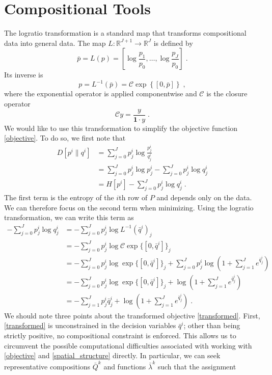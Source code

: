 \documentclass[english]{scrartcl}
\newcommand\R[0]{\mathbb{R}}
\begin{document}
\section{Compositional Tools}
	The logratio transformation is a standard map that transforms compositional data into general data. The map $L:\R^{J+1} \rightarrow \R^J$ is defined by
	\begin{equation}
		\bar{p} = L(p) = \left[\log \frac{p_1}{p_0},\ldots,\log \frac{p_J}{p_0}\right]\;.
	\end{equation}
	Its inverse is
	\begin{equation}
		p = L^{-1}(\bar{p}) = \mathcal{C}\exp\left\{[0, \bar{p}] \right\}\;,
	\end{equation}
	where the exponential operator is applied componentwise and $\mathcal{C}$ is the closure operator
	\begin{equation}
		\mathcal{C}y = \frac{y}{\mathbf{1}\cdot y} \;.
	\end{equation}
	We would like to use this transformation to simplify the objective function \eqref{objective}. To do so, we first note that
	\begin{align}
		D[p^i\|q^i] &= \sum_{j = 0}^J p^i_j \log \frac{p^i_j}{q^i_j} \\
		&= \sum_{j = 0}^J p^i_j \log p_j^i - \sum_{j = 0}^J p^i_j \log q_j^i \\
		&= H[p^i] - \sum_{j = 0}^J p^i_j \log q_j^i\;.
	\end{align}
	The first term is the entropy of the $i$th row of $P$ and depends only on the data. We can therefore focus on the second term when minimizing. Using the logratio transformation, we can write this term as
	\begin{align}
		- \sum_{j = 0}^J p^i_j \log q_j^i &= - \sum_{j = 0}^J p^i_j \log L^{-1}(\bar{q}^i)_j \\
		&= - \sum_{j = 0}^J p^i_j \log \mathcal{C}\exp\{[0,\bar{q}^i]\}_j \\
		&= - \sum_{j = 0}^J p^i_j \log \exp\{[0,\bar{q}^i]\}_j + \sum_{j=0}^J p^i_j \log \left(1 + \sum_{j = 1}^J e^{\bar{q}^i_j}\right)\\
		&= - \sum_{j = 0}^J p^i_j \log \exp\{[0,\bar{q}^i]\}_j + \log \left(1 + \sum_{j = 1}^J e^{\bar{q}^i_j}\right) \\
		&= - \sum_{j = 1}^J p^i_j \bar{q}^i_j  + \log \left(1 + \sum_{j = 1}^J e^{\bar{q}^i_j}\right)\;. \label{transformed}
	\end{align}
	We should note three points about the transformed objective \eqref{transformed}. First, \eqref{transformed} is unconstrained in the decision variables $\bar{q}^i$; other than being strictly positive, no compositional constraint is enforced. This allows us to circumvent the possible computational difficulties associated with working with \eqref{objective} and \eqref{spatial_structure} directly. In particular, we can seek representative compositions $\bar{Q}^k$ and functions $\bar{\lambda}^k$ such that the assignment
\end{document}
